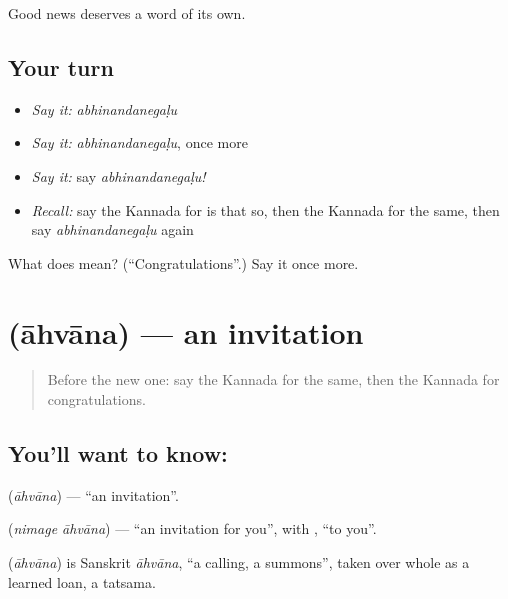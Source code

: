 \begin{grammarlens}[title={What you've built}]
Good news deserves a word of its own.
\end{grammarlens}

\subsection*{Your turn}
\begin{itemize}
\raggedright
  \item \emph{Say it:} \emph{abhinandanegaḷu}
  \item \emph{Say it:} \emph{abhinandanegaḷu}, once more
  \item \emph{Say it:} say \emph{abhinandanegaḷu!}
  \item \emph{Recall:} say the Kannada for is that so, then the Kannada for the same, then say \emph{abhinandanegaḷu} again
\end{itemize}

\begin{tcolorbox}[breakable,colback=teal!4,colframe=teal!35!black,title={Before you move on}]
What does  mean? (\textquotedblleft{}Congratulations\textquotedblright{}.) Say it once more.
\end{tcolorbox}
\section[\texorpdfstring{\kn{ಆಹ್ವಾನ} (āhvāna)}{ಆಹ್ವಾನ (āhvāna)}]{ (āhvāna) — an invitation}

\label{lesson:KA-C88-invitation}



\begin{quote}
Before the new one: say the Kannada for the same, then the Kannada for congratulations.
\end{quote}

\subsection*{You'll want to know: }
\textbf{} (\emph{āhvāna}) — \textquotedblleft{}an invitation\textquotedblright{}.

\textbf{ } (\emph{nimage āhvāna}) — \textquotedblleft{}an invitation for you\textquotedblright{}, with \textbf{}, \textquotedblleft{}to you\textquotedblright{}.

\begin{cousinweb}
\textbf{} (\emph{āhvāna}) is Sanskrit \emph{āhvāna}, \textquotedblleft{}a calling, a summons\textquotedblright{}, taken over whole as a learned loan, a tatsama.
\end{cousinweb}

